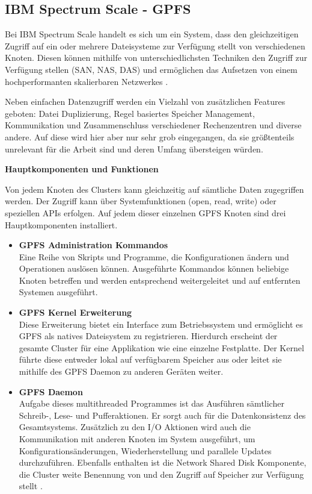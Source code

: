 \subsection{IBM Spectrum Scale - GPFS}

Bei IBM Spectrum Scale handelt es sich um ein System, dass den gleichzeitigen Zugriff auf ein oder mehrere Dateisysteme zur Verfügung stellt von verschiedenen Knoten. Diesen können mithilfe von unterschiedlichsten Techniken den Zugriff zur Verfügung stellen (SAN, NAS, DAS) und ermöglichen das Aufsetzen von einem hochperformanten skalierbaren Netzwerkes \parencite[S. 1]{ibm.2017}.

Neben einfachen Datenzugriff werden ein Vielzahl von zusätzlichen Features geboten: Datei Duplizierung, Regel basiertes Speicher Management, Kommunikation und Zusammenschluss verschiedener Rechenzentren und diverse andere. Auf diese wird hier aber nur sehr grob eingegangen, da sie größtenteils unrelevant für die Arbeit sind und deren Umfang übersteigen würden.

\textbf{Hauptkomponenten und Funktionen}

Von jedem Knoten des Clusters kann gleichzeitig auf sämtliche Daten zugegriffen werden. Der Zugriff kann über Systemfunktionen (open, read, write) oder speziellen APIs erfolgen. Auf jedem dieser einzelnen GPFS Knoten sind drei Hauptkomponenten installiert.

\begin{itemize}
	\item \textbf{GPFS Administration Kommandos} \\
	Eine Reihe von Skripts und Programme, die Konfigurationen ändern und Operationen auslösen können. Ausgeführte Kommandos können beliebige Knoten betreffen und werden entsprechend weitergeleitet und auf entfernten Systemen ausgeführt.
	\item \textbf{GPFS Kernel Erweiterung} \\
	Diese Erweiterung bietet ein Interface zum Betriebssystem und ermöglicht es GPFS als natives Dateisystem zu registrieren. Hierdurch erscheint der gesamte Cluster für eine Applikation wie eine einzelne Festplatte. Der Kernel führte diese entweder lokal auf verfügbarem Speicher aus oder leitet sie mithilfe des GPFS Daemon zu anderen Geräten weiter.
	\item \textbf{GPFS Daemon} \\
	Aufgabe dieses multithreaded Programmes ist das Ausführen sämtlicher Schreib-, Lese- und Pufferaktionen. Er sorgt auch für die Datenkonsistenz des Gesamtsystems. Zusätzlich zu den I/O Aktionen wird auch die Kommunikation mit anderen Knoten im System ausgeführt, um Konfigurationsänderungen, Wiederherstellung und parallele Updates durchzuführen.
	Ebenfalls enthalten ist die Network Shared Disk Komponente, die Cluster weite Benennung von und den Zugriff auf Speicher zur Verfügung stellt \parencite[S. 6]{ibm.2017}.  
\end{itemize} 

